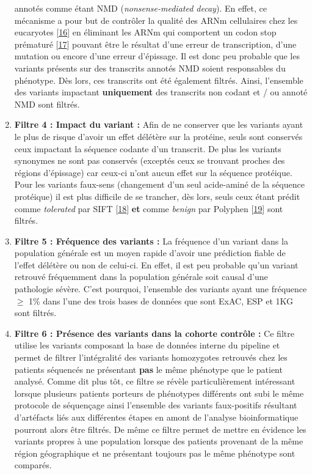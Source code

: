 \documentclass[12pt,twoside]{reedthesis}
\theoremstyle{definition}
\theoremstyle{definition}
\theoremstyle{remark}
\begin{document}
\begin{enumerate}
    annotés comme étant NMD (\emph{nonsense-mediated decay}). En effet, ce
    mécanisme a pour but de contrôler la qualité des ARNm cellulaires chez
    les eucaryotes {[}\protect\hyperlink{ref-Chang2007}{16}{]} en
    éliminant les ARNm qui comportent un codon stop prématuré
    {[}\protect\hyperlink{ref-Baker2004}{17}{]} pouvant être le résultat
    d'une erreur de transcription, d'une mutation ou encore d'une erreur
    d'épissage. Il est donc peu probable que les variants présents sur des
    transcrits annotés NMD soient responsables du phénotype. Dès lors, ces
    transcrits ont été également filtrés. Ainsi, l'ensemble des variants
    impactant \textbf{uniquement} des transcrits non codant et / ou annoté
    NMD sont filtrés.
  \item
    \textbf{Filtre 4 : Impact du variant :} Afin de ne conserver que les
    variants ayant le plus de risque d'avoir un effet délétère sur la
    protéine, seuls sont conservés ceux impactant la séquence codante d'un
    transcrit. De plus les variants synonymes ne sont pas conservés
    (exceptés ceux se trouvant proches des régions d'épissage) car ceux-ci
    n'ont aucun effet sur la séquence protéique. Pour les variants
    faux-sens (changement d'un seul acide-aminé de la séquence protéique)
    il est plus difficile de se trancher, dès lors, seuls ceux étant
    prédit comme \emph{tolerated} par SIFT
    {[}\protect\hyperlink{ref-Kumar2009}{18}{]} \textbf{et} comme
    \emph{benign} par Polyphen
    {[}\protect\hyperlink{ref-Adzhubei2010}{19}{]} sont filtrés.
  \item
    \textbf{Filtre 5 : Fréquence des variants :} La fréquence d'un variant
    dans la population générale est un moyen rapide d'avoir une prédiction
    fiable de l'effet délétère ou non de celui-ci. En effet, il est peu
    probable qu'un variant retrouvé fréquemment dans la population
    générale soit causal d'une pathologie sévère. C'est pourquoi,
    l'ensemble des variants ayant une fréquence \(\ge\) 1\% dans l'une des
    trois bases de données que sont ExAC, ESP et 1KG sont filtrés.
  \item
    \textbf{Filtre 6 : Présence des variants dans la cohorte contrôle :}
    Ce filtre utilise les variants composant la base de données interne du
    pipeline et permet de filtrer l'intégralité des variants homozygotes
    retrouvés chez les patients séquencés ne présentant \textbf{pas} le
    même phénotype que le patient analysé. Comme dit plus tôt, ce filtre
    se révèle particulièrement intéressant lorsque plusieurs patients
    porteurs de phénotypes différents ont subi le même protocole de
    séquençage ainsi l'ensemble des variants faux-positifs résultant
    d'artéfacts liés aux différentes étapes en amont de l'analyse
    bioinformatique pourront alors être filtrés. De même ce filtre permet
    de mettre en évidence les variants propres à une population lorsque
    des patients provenant de la même région géographique et ne présentant
    toujours pas le même phénotype sont comparés.
  \end{enumerate}
  
\end{document}

